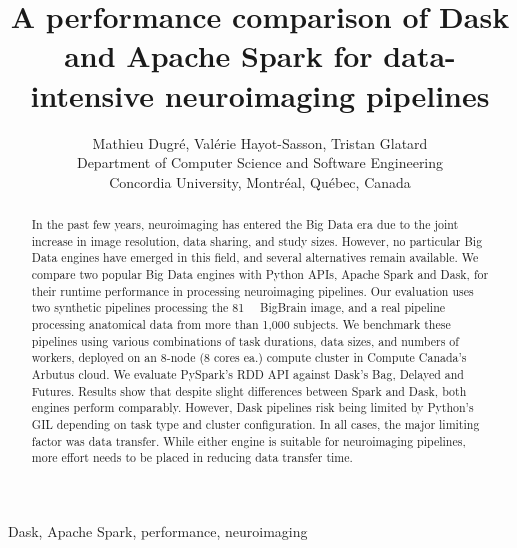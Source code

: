 \documentclass[conference]{IEEEtran}
\begin{document}
\title{A performance comparison of Dask and Apache Spark for data-intensive neuroimaging pipelines}

\author{Mathieu Dugr\'e, Val\'erie Hayot-Sasson, Tristan Glatard\\
Department of Computer Science and Software Engineering\\
Concordia University, Montr\'eal, Qu\'ebec, Canada 
\vspace*{0.8cm} %
}

\maketitle

\begin{abstract}

In the past few years, neuroimaging has entered the Big Data era due to the joint
increase in image resolution, data sharing, and study sizes. However, no particular
Big Data engines have emerged in this field, and several alternatives remain
available. We compare two popular Big Data engines with Python APIs, Apache Spark and
Dask, for their runtime performance in processing neuroimaging pipelines. Our
evaluation uses two synthetic pipelines processing the \SI{81}{\giga\byte} BigBrain
image, and a real pipeline processing anatomical data from more than 1,000 subjects.
We benchmark these pipelines using various combinations of task durations, data
sizes, and numbers of workers, deployed on an 8-node (8 cores ea.) compute cluster in
Compute Canada's Arbutus cloud. We evaluate PySpark's RDD API against Dask's Bag,
Delayed and Futures. Results show that despite slight differences between Spark and
Dask, both engines perform comparably. However, Dask pipelines risk being limited
by Python's GIL depending on task type and cluster configuration. In all cases, the
major limiting factor was data transfer. While either engine is suitable for
neuroimaging pipelines, more effort needs to be placed in reducing data transfer time.
\end{abstract}

\begin{IEEEkeywords}
Dask, Apache Spark, performance, neuroimaging
\end{IEEEkeywords}
\end{document}
